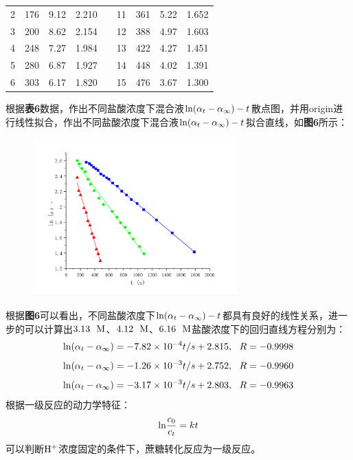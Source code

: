\documentclass[12pt]{article}
\begin{document}
\begin{table}[!h]
\begin{tabular}{ccccccccc}
					2  & 176           & 9.12                & 2.210   &  & 11 & 361           & 5.22                & 1.652   \\
					3  & 200           & 8.62                & 2.154   &  & 12 & 388           & 4.97                & 1.603    \\
					4  & 248           & 7.27                & 1.984   &  & 13 & 422           & 4.27                & 1.451   \\
					5  & 280           & 6.87                & 1.927   &  & 14 & 448           & 4.02                & 1.391   \\
					6  & 303           & 6.17                & 1.820   &  & 15 & 476           & 3.67                & 1.300   \\
					\bottomrule
					\end{tabular}
					\end{table}
					根据\textbf{表6}数据，作出不同盐酸浓度下混合液${\rm ln}(\alpha_{t}-\alpha_{\infty})-t$散点图，并用origin进行线性拟合，作出不同盐酸浓度下混合液${\rm ln}(\alpha_{t}-\alpha_{\infty})-t$拟合直线，如\textbf{图6}所示：\par
					\vbox{}
					\vbox{}
					\begin{figure}[!h]
						\centering
						\includegraphics[width=0.70\textwidth]{6.png}
					\end{figure}
					根据\textbf{图6}可以看出，不同盐酸浓度下${\rm ln}(\alpha_{t}-\alpha_{\infty})-t$都具有良好的线性关系，进一步的可以计算出$3.13\ \ {\rm M}$、$4.12\ \ {\rm M}$、$6.16\ \ {\rm M}$盐酸浓度下的回归直线方程分别为：
					$$
					{\rm ln}(\alpha_{t}-\alpha_{\infty})=-7.82\times10^{-4}t/s+2.815,\ \ R=-0.9998
					$$
					$$
					{\rm ln}(\alpha_{t}-\alpha_{\infty})=-1.26\times10^{-3}t/s+2.752,\ \ R=-0.9960
					$$
					$$
					{\rm ln}(\alpha_{t}-\alpha_{\infty})=-3.17\times10^{-3}t/s+2.803,\ \ R=-0.9963
					$$
					根据一级反应的动力学特征：
					$$
					{\rm ln}\frac{c_{0}}{c_{t}}=kt
					$$
					可以判断$\rm H^{+}$浓度固定的条件下，蔗糖转化反应为一级反应。
\end{document}
